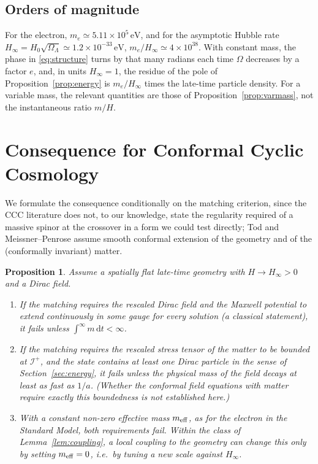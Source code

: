 \documentclass[11pt,a4paper]{article}
\newtheorem{proposition}{Proposition}
\theoremstyle{definition}
\newcommand{\scri}{\mathscr{I}^{+}}
\newcommand{\dd}{\mathrm{d}}
\begin{document}
\subsection{Orders of magnitude}

For the electron, $m_{e}\simeq5.11\times10^{5}\,\mathrm{eV}$, and for the asymptotic Hubble rate $H_{\infty}=H_{0}\sqrt{\Omega_{\Lambda}}\simeq1.2\times10^{-33}\,\mathrm{eV}$, $m_{e}/H_{\infty}\simeq4\times10^{38}$. With constant mass, the phase in \eqref{eq:structure} turns by that many radians each time $\Omega$ decreases by a factor $e$, and, in units $H_{\infty}=1$, the residue of the pole of Proposition~\ref{prop:energy} is $m_{e}/H_{\infty}$ times the late-time particle density. For a variable mass, the relevant quantities are those of Proposition~\ref{prop:varmass}, not the instantaneous ratio $m/H$.

\section{Consequence for Conformal Cyclic Cosmology}
\label{sec:ccc}

We formulate the consequence conditionally on the matching criterion, since the CCC literature does not, to our knowledge, state the regularity required of a massive spinor at the crossover in a form we could test directly; Tod \cite{Tod2013} and Meissner--Penrose \cite{MeissnerPenrose2025} assume smooth conformal extension of the geometry and of the (conformally invariant) matter.

\begin{proposition}
\label{prop:ccc}
Assume a spatially flat late-time geometry with $H\to H_{\infty}>0$ and a Dirac field.
\begin{enumerate}[label=(\alph*)]
\item If the matching requires the rescaled Dirac field and the Maxwell potential to extend continuously in some gauge for every solution (a classical statement), it fails unless $\int^{\infty}m\,\dd t<\infty$.
\item If the matching requires the rescaled stress tensor of the matter to be bounded at $\scri$, and the state contains at least one Dirac particle in the sense of Section~\ref{sec:energy}, it fails unless the physical mass of the field decays at least as fast as $1/a$. (Whether the conformal field equations with matter require exactly this boundedness is not established here.)
\item With a constant non-zero effective mass $m_{\rm eff}$, as for the electron in the Standard Model, both requirements fail. Within the class of Lemma~\ref{lem:coupling}, a local coupling to the geometry can change this only by setting $m_{\rm eff}=0$, i.e.\ by tuning a new scale against $H_{\infty}$.
\end{enumerate}
\end{proposition}
\end{document}
